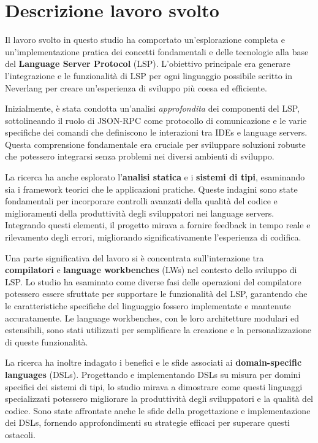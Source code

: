 \documentclass{adapt-lab}
\begin{document}
\section{Descrizione lavoro svolto}

Il lavoro svolto in questo studio ha comportato un'esplorazione completa e un'implementazione pratica dei concetti fondamentali e delle tecnologie alla base del \textbf{Language Server Protocol} (LSP). L'obiettivo principale era generare l'integrazione e le funzionalità di LSP per ogni linguaggio possibile scritto in Neverlang per creare un'esperienza di sviluppo più coesa ed efficiente.

Inizialmente, è stata condotta un'analisi \textit{approfondita} dei componenti del LSP, sottolineando il ruolo di JSON-RPC come protocollo di comunicazione e le varie specifiche dei comandi che definiscono le interazioni tra IDEs e language servers. Questa comprensione fondamentale era cruciale per sviluppare soluzioni robuste che potessero integrarsi senza problemi nei diversi ambienti di sviluppo.

La ricerca ha anche esplorato l'\textbf{analisi statica} e i \textbf{sistemi di tipi}, esaminando sia i framework teorici che le applicazioni pratiche. Queste indagini sono state fondamentali per incorporare controlli avanzati della qualità del codice e miglioramenti della produttività degli sviluppatori nei language servers. Integrando questi elementi, il progetto mirava a fornire feedback in tempo reale e rilevamento degli errori, migliorando significativamente l'esperienza di codifica.

Una parte significativa del lavoro si è concentrata sull'interazione tra \textbf{compilatori} e \textbf{language workbenches} (LWs) nel contesto dello sviluppo di LSP. Lo studio ha esaminato come diverse fasi delle operazioni del compilatore potessero essere sfruttate per supportare le funzionalità del LSP, garantendo che le caratteristiche specifiche del linguaggio fossero implementate e mantenute accuratamente. Le language workbenches, con le loro architetture modulari ed estensibili, sono stati utilizzati per semplificare la creazione e la personalizzazione di queste funzionalità.

La ricerca ha inoltre indagato i benefici e le sfide associati ai \textbf{domain-specific languages} (DSLs). Progettando e implementando DSLs su misura per domini specifici dei sistemi di tipi, lo studio mirava a dimostrare come questi linguaggi specializzati potessero migliorare la produttività degli sviluppatori e la qualità del codice. Sono state affrontate anche le sfide della progettazione e implementazione dei DSLs, fornendo approfondimenti su strategie efficaci per superare questi ostacoli.
\end{document}
